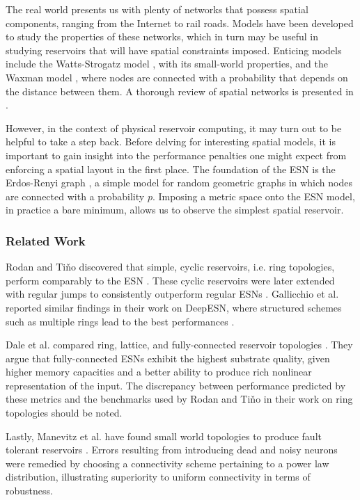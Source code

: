 The real world presents us with plenty of networks that possess spatial
components, ranging from the Internet to rail roads. Models have been developed
to study the properties of these networks, which in turn may be useful in
studying reservoirs that will have spatial constraints imposed. Enticing models
include the Watts-Strogatz model \cite{watts_collective_1998}, with its
small-world properties, and the Waxman model \cite{waxman_routing_1988}, where
nodes are connected with a probability that depends on the distance between
them. A thorough review of spatial networks is presented in
\cite{barthelemy_spatial_2011}.

However, in the context of physical reservoir computing, it may turn out to be
helpful to take a step back. Before delving for interesting spatial models, it
is important to gain insight into the performance penalties one might expect
from enforcing a spatial layout in the first place. The foundation of the ESN is
the Erdos-Renyi graph \cite{erdos_random_1959}, a simple model for random
geometric graphs in which nodes are connected with a probability $p$. Imposing a
metric space onto the ESN model, in practice a bare minimum, allows us to
observe the simplest spatial reservoir.

\subsubsection{Related Work}

Rodan and Tiňo discovered that simple, cyclic reservoirs, i.e. ring topologies,
perform comparably to the ESN \cite{rodan_minimum_2011}. These cyclic reservoirs
were later extended with regular jumps to consistently outperform regular ESNs
\cite{rodan_simple_2012}. Gallicchio et al. reported similar findings in their
work on DeepESN, where structured schemes such as multiple rings lead to the
best performances \cite{gallicchio_reservoir_2019}.

Dale et al. compared ring, lattice, and fully-connected reservoir topologies
\cite{mcquillan_role_2019}.  They argue that fully-connected ESNs exhibit the
highest substrate quality, given higher memory capacities and a better ability
to produce rich nonlinear representation of the input. The discrepancy between
performance predicted by these metrics and the benchmarks used by Rodan and Tiňo
in their work on ring topologies should be noted.

Lastly, Manevitz et al. have found small world topologies to produce fault
tolerant reservoirs \cite{sidorov_stability_2010}. Errors resulting from
introducing dead and noisy neurons were remedied by choosing a connectivity
scheme pertaining to a power law distribution, illustrating superiority to
uniform connectivity in terms of robustness.

